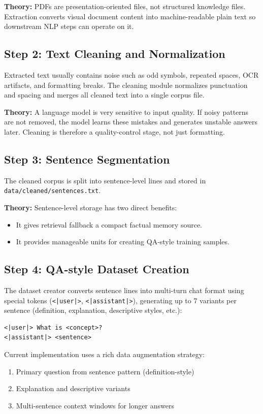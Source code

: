 \documentclass[a4paper,11pt]{article}
\begin{document}
\textbf{Theory:}
PDFs are presentation-oriented files, not structured knowledge files.
Extraction converts visual document content into machine-readable plain text so downstream NLP steps can operate on it.

\subsection{Step 2: Text Cleaning and Normalization}
Extracted text usually contains noise such as odd symbols, repeated spaces, OCR artifacts, and formatting breaks.
The cleaning module normalizes punctuation and spacing and merges all cleaned text into a single corpus file.

\textbf{Theory:}
A language model is very sensitive to input quality.
If noisy patterns are not removed, the model learns these mistakes and generates unstable answers later.
Cleaning is therefore a quality-control stage, not just formatting.

\subsection{Step 3: Sentence Segmentation}
The cleaned corpus is split into sentence-level lines and stored in \texttt{data/cleaned/sentences.txt}.

\textbf{Theory:}
Sentence-level storage has two direct benefits:
\begin{itemize}[leftmargin=1.5em]
    \item It gives retrieval fallback a compact factual memory source.
    \item It provides manageable units for creating QA-style training samples.
\end{itemize}

\subsection{Step 4: QA-style Dataset Creation}
The dataset creator converts sentence lines into multi-turn chat format using special tokens (\texttt{<|user|>}, \texttt{<|assistant|>}), generating up to 7 variants per sentence (definition, explanation, descriptive styles, etc.):
\begin{verbatim}
<|user|> What is <concept>?
<|assistant|> <sentence>
\end{verbatim}

Current implementation uses a rich data augmentation strategy:
\begin{enumerate}[leftmargin=1.5em]
    \item Primary question from sentence pattern (definition-style)
    \item Explanation and descriptive variants
    \item Multi-sentence context windows for longer answers
\end{enumerate}
\end{document}

